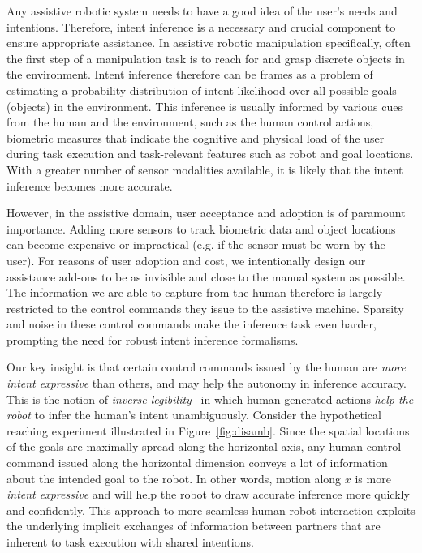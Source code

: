 Any assistive robotic system needs to have a good idea of the user's needs and intentions. Therefore, intent inference is a necessary and crucial component to ensure appropriate assistance. In assistive robotic manipulation specifically, often the first step of a manipulation task is to reach for and grasp discrete objects in the environment. Intent inference therefore can be frames as a problem of estimating a probability distribution of intent likelihood over all possible goals (objects) in the environment. This inference is usually informed by various cues from the human and the environment, such as the human control actions, biometric measures that indicate the cognitive and physical load of the user during task execution and task-relevant features such as robot and goal locations. With a greater number of sensor modalities available, it is likely that the intent inference becomes more accurate. 

However, in the assistive domain, user acceptance and adoption is of paramount importance. Adding more sensors to track biometric data and object locations can become expensive or impractical (e.g. if the sensor must be worn by the user). For reasons of user adoption and cost, we intentionally design our assistance add-ons to be as invisible and close to the manual system as possible. The information we are able to capture from the human therefore is largely restricted to the control commands they issue to the assistive machine. Sparsity and noise in these control commands make the inference task even harder, prompting the need for robust intent inference formalisms. 

Our key insight is that certain control commands issued by the human are \textit{more intent expressive} than others, and may help the autonomy in inference accuracy. This is the notion of \textit{inverse legibility}~\citep{gopinath2017mode} in which human-generated actions \textit{help the robot} to infer the human's intent unambiguously. Consider the hypothetical reaching experiment illustrated in Figure~\ref{fig:disamb}. Since the spatial locations of the goals are maximally spread along the horizontal axis, any human control command issued along the horizontal dimension conveys a lot of information about the intended goal to the robot. In other words, motion along $x$ is more \textit{intent expressive} and will help the robot to draw accurate inference more quickly and confidently. This approach to more seamless human-robot interaction exploits the underlying implicit exchanges of information between partners that are inherent to task execution with shared intentions. 


